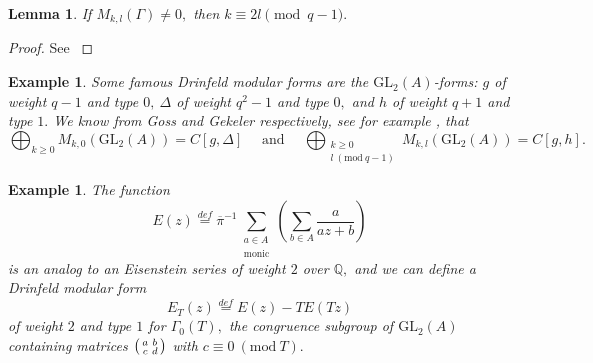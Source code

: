 \documentclass[11pt]{amsart}
\newtheorem{lemma}[theorem]{Lemma}
\newtheorem{example}[theorem]{Example}
\theoremstyle{definition}
\newenvironment{psmallmatrix}
{\left(\begin{smallmatrix}}
	{\end{smallmatrix}\right)}
\numberwithin{equation}{section}
\newcommand{\GL}{\mathrm{GL}} 	%
\newcommand{\bbF}{\mathbb{F}}		%
\newcommand{\bbQ}{\mathbb{Q}}		%
\newcommand{\Mod}[1]{\ (\mathrm{mod}\ #1)}
\begin{document}
		\begin{lemma}\cite[Remark $(5.8.\mathrm{i})$]{Gekeler-Coeff}\label{l: weight-type}
			If $M_{k,l}(\Gamma)\neq 0,$ then $k\equiv 2l\pmod{q-1}.$
		\end{lemma}
		\begin{proof}
			See \cite[Remark $(5.8.\mathrm{iii})$]{Gekeler-Coeff}
		\end{proof}
		
		\begin{example}
			Some famous Drinfeld modular forms are the $\GL_2(A)$-forms: $g$ of weight $q-1$ and type $0, ~\Delta$ of weight $q^2-1$ and type $0,$ and $h$ of weight $q+1$ and type $1.$ We know from Goss and Gekeler respectively, see for example \cite[Theorem $(3.12)$]{Gekeler-survey-Drinfeld-modular-forms}, that 
			\[\bigoplus_{k\geq 0} M_{k,0}(\GL_2(A))=C[g,\Delta] \quad \text{ and }\quad \bigoplus_{\substack{k\geq 0\\l\Mod{q-1}}} M_{k,l}(\GL_2(A))=C[g,h].\]
		\end{example}
		
		\begin{example}\cite[Section $8$]{Gekeler-Coeff}
		\label{example: Eisenstein series for Gamma0(T)}
			The function \[E(z)\overset{def}{=}\overline{\pi}^{-1}\sum\limits_{\substack{a\in A\\\text{monic}}}\left(\sum_{b\in A}\frac{a}{az+b}\right)\]
			is an analog to an Eisenstein series of weight $2$ over $\bbQ,$ and we can define a Drinfeld modular form 
			\[E_T(z)\overset{def}{=}E(z)-TE(Tz)\]
			of weight $2$ and type $1$ for $\Gamma_0(T),$ the congruence subgroup of $\GL_2(A)$ containing matrices $\displaystyle{\begin{psmallmatrix}a&b\\c&d\end{psmallmatrix}}$ with $c\equiv 0\Mod T.$
		\end{example}
		
\end{document}
